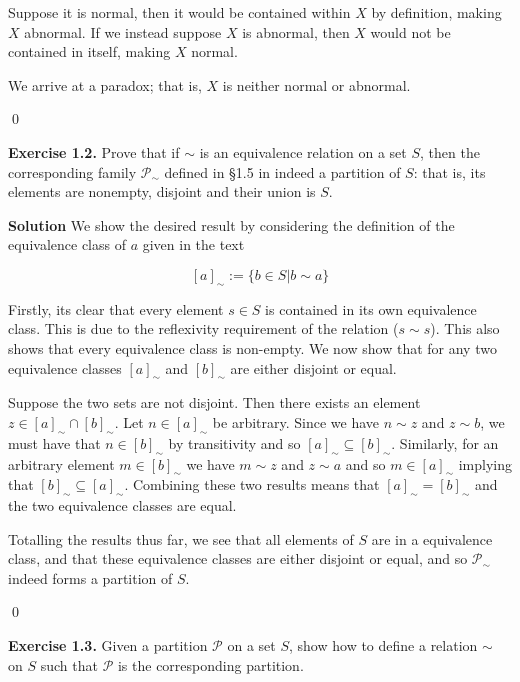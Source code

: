 \documentclass[titlepage]{article}
\begin{document}
\medskip

 Suppose it is normal, then it would be contained within $X$ by definition, making $X$ abnormal. If we instead suppose $X$ is abnormal, then $X$ would not be contained in itself, making $X$ normal.


\medskip
 We arrive at a paradox; that is, $X$ is neither normal or abnormal.

 \qed

\bigskip

\textbf{Exercise 1.2.} Prove that if $\sim$ is an  equivalence relation on a set $S$, then the corresponding family $\mathscr{P}_{\sim}$ defined in \S 1.5 in indeed a partition of $S$: that is, its elements are nonempty, disjoint and their union is $S$. 

\medskip

\textbf{Solution} We show the desired result by considering the definition of the equivalence class of $a$ given in the text

\[ [a]_{\sim} := \{b \in S | b \sim a\} \]

Firstly, its clear that every element $s \in S$ is contained in its own equivalence class. This is due to the reflexivity requirement of the relation ($s \sim s$). This also shows that every equivalence class is non-empty. We now show that for any two equivalence classes $[a]_{\sim}$ and $[b]_{\sim}$ are either disjoint or equal.

Suppose the two sets are not disjoint. Then there exists an element $z \in [a]_{\sim} \cap [b]_{\sim}$. Let $n \in [a]_{\sim}$ be arbitrary. Since we have $n \sim z$ and $z \sim b$, we must have that $n \in [b]_{\sim}$ by transitivity and so $[a]_{\sim} \subseteq [b]_{\sim}$. Similarly, for an arbitrary element $m \in [b]_{\sim}$ we have $m \sim z$ and $z \sim a$ and so $m \in [a]_{\sim}$ implying that $[b]_{\sim} \subseteq [a]_{\sim}$. Combining these two results means that $[a]_{\sim} = [b]_{\sim}$ and the two equivalence classes are equal.

Totalling the results thus far, we see that all elements of $S$ are in a equivalence class, and that these equivalence classes are either disjoint or equal, and so $\mathscr{P}_{\sim}$ indeed forms a partition of $S$.

\qed

\bigskip

\textbf{Exercise 1.3.} Given a partition $\mathscr{P}$ on a set $S$, show how to define a relation $\sim$ on $S$ such that $\mathscr{P}$ is the corresponding partition.
\end{document}
